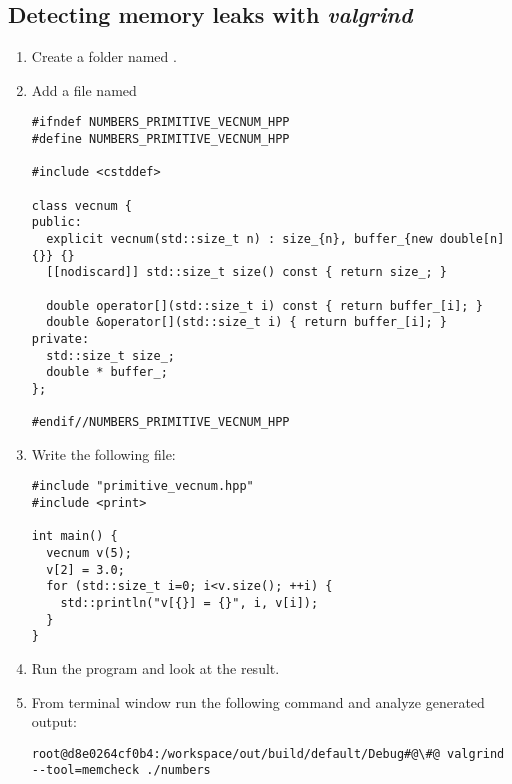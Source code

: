 \subsection{Detecting memory leaks with \emph{valgrind}}

\begin{enumerate}

\item
Create a folder named .

\item 
Add a file named

\begin{lstlisting}
#ifndef NUMBERS_PRIMITIVE_VECNUM_HPP
#define NUMBERS_PRIMITIVE_VECNUM_HPP

#include <cstddef>

class vecnum {
public:
  explicit vecnum(std::size_t n) : size_{n}, buffer_{new double[n]{}} {}
  [[nodiscard]] std::size_t size() const { return size_; }

  double operator[](std::size_t i) const { return buffer_[i]; }
  double &operator[](std::size_t i) { return buffer_[i]; }
private:
  std::size_t size_;
  double * buffer_;
};

#endif//NUMBERS_PRIMITIVE_VECNUM_HPP
\end{lstlisting}

\item
Write the following 
 file:

\begin{lstlisting}
#include "primitive_vecnum.hpp"
#include <print>

int main() {
  vecnum v(5);
  v[2] = 3.0;
  for (std::size_t i=0; i<v.size(); ++i) {
    std::println("v[{}] = {}", i, v[i]);
  }
}
\end{lstlisting}

\item
Run the program and look at the result.

\item
From terminal window run the following command and analyze generated output:

\begin{lstlisting}[style=terminal,escapechar=@]
root@d8e0264cf0b4:/workspace/out/build/default/Debug#@\#@ valgrind --tool=memcheck ./numbers
\end{lstlisting}

\end{enumerate}

